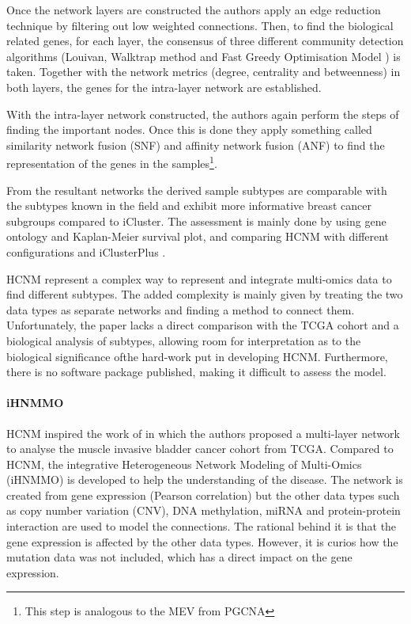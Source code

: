 Once the network layers are constructed the authors apply an edge reduction technique by filtering out low weighted connections. Then, to find the biological related genes, for each layer, the consensus of three different community detection algorithms (Louivan\cite{Blondel2008-ik}, Walktrap method \citet{Pons2005-oa} and Fast Greedy Optimisation Model \citet{Clauset2004-em}) is taken. Together with the network metrics (degree, centrality and betweenness) in both layers, the genes for the intra-layer network are established.

With the intra-layer network constructed, the authors again perform the steps of finding the important nodes. Once this is done they apply something called similarity network fusion (SNF) and affinity network fusion (ANF) to find the representation of the genes in the samples\footnote{This step is analogous to the MEV from PGCNA}. 

From the resultant networks the derived sample subtypes are comparable with the subtypes known in the field and exhibit more informative breast cancer subgroups compared to iCluster. The assessment is mainly done by using gene ontology and Kaplan-Meier survival plot, and comparing HCNM with different configurations and iClusterPlus \citet{Mo2013-zi}. 

HCNM represent a complex way to represent and integrate multi-omics data to find different subtypes. The added complexity is mainly given by treating the two data types as separate networks and finding a method to connect them. Unfortunately, the paper lacks a direct comparison with the TCGA cohort and a biological analysis of subtypes, allowing room for interpretation as to the biological significance ofthe hard-work put in developing HCNM. Furthermore, there is no software package published, making it difficult to assess the model. 

\paragraph*{iHNMMO} \label{s:lit:iHNMMO}

HCNM inspired the work of \citet{Peng2017-ik} in which the authors proposed a multi-layer network to analyse the muscle invasive bladder cancer cohort from TCGA. Compared to HCNM, the integrative Heterogeneous Network Modeling of Multi-Omics (iHNMMO) is developed to help the understanding of the disease. The network is created from gene expression (Pearson correlation) but the other data types such as copy number variation (CNV), DNA methylation, miRNA and protein-protein interaction are used to model the connections. The rational behind it is that the gene expression is affected by the other data types. However, it is curios how the mutation data was not included, which has a direct impact on the gene expression.

